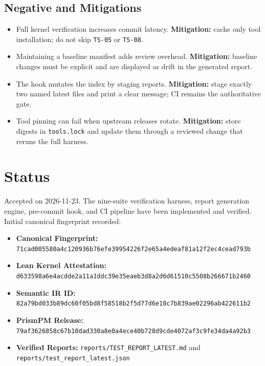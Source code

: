 \documentclass[11pt]{article}
\begin{document}
\subsection{Negative and Mitigations}

\begin{itemize}
  \item Full kernel verification increases commit latency. \textbf{Mitigation:} cache only tool
        installation; do not skip \texttt{TS-05} or \texttt{TS-08}.
  \item Maintaining a baseline manifest adds review overhead. \textbf{Mitigation:} baseline changes
        must be explicit and are displayed as drift in the generated report.
  \item The hook mutates the index by staging reports. \textbf{Mitigation:} stage exactly two named
        latest files and print a clear message; CI remains the authoritative gate.
  \item Tool pinning can fail when upstream releases rotate. \textbf{Mitigation:} store digests in
        \texttt{tools.lock} and update them through a reviewed change that reruns the full harness.
\end{itemize}

\section{Status}

Accepted on 2026-11-23. The nine-suite verification harness, report generation engine, pre-commit hook, and CI pipeline have been implemented and verified. Initial canonical fingerprint recorded:
\begin{itemize}
  \item \textbf{Canonical Fingerprint:} \texttt{71cad005580a4c120936b76efe39954226f2e65a4edeaf81a12f2ec4cead793b}
  \item \textbf{Lean Kernel Attestation:} \texttt{d633598a6e4acdde2a11a1ddc39e35eaeb3d8a2d6d61510c5508b266671b2460}
  \item \textbf{Semantic IR ID:} \texttt{82a79bd033b89dc60f05bd8f58518b2f5d77d6e10c7b839ae02296ab422611b2}
  \item \textbf{PrismPM Release:} \texttt{79af3626858c67b10dad330a8e0a4ece40b728d9cde4072af3c9fe34da4a92b3}
  \item \textbf{Verified Reports:} \texttt{reports/TEST\_REPORT\_LATEST.md} and \texttt{reports/test\_report\_latest.json}
\end{itemize}
\end{document}
